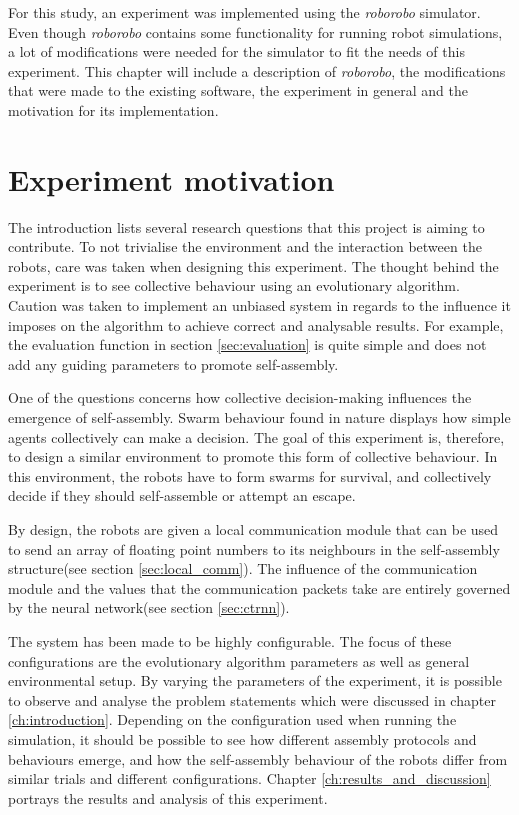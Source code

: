 For this study, an experiment was implemented using the \emph{roborobo} simulator\cite{bredeche_roborobo!_2013}.
Even though \emph{roborobo} contains some functionality for running robot simulations, a lot of modifications were needed for the simulator to fit the needs of this experiment.
This chapter will include a description of \emph{roborobo}, the modifications that were made to the existing software, the experiment in general and the motivation for its implementation.

\section{Experiment motivation}
The introduction lists several research questions that this project is aiming to contribute.
To not trivialise the environment and the interaction between the robots, care was taken when designing this experiment.
The thought behind the experiment is to see collective behaviour using an evolutionary algorithm.
Caution was taken to implement an unbiased system in regards to the influence it imposes on the algorithm to achieve correct and analysable results.  
For example, the evaluation function in section \ref{sec:evaluation} is quite simple and does not add any guiding parameters to promote self-assembly.

One of the questions concerns how collective decision-making influences the emergence of self-assembly.
Swarm behaviour found in nature displays how simple agents collectively can make a decision.
The goal of this experiment is, therefore, to design a similar environment to promote this form of collective behaviour.
In this environment, the robots have to form swarms for survival, and collectively decide if they should self-assemble or attempt an escape.

By design, the robots are given a local communication module that can be used to send an array of floating point numbers to its neighbours in the self-assembly structure(see section \ref{sec:local_comm}).
The influence of the communication module and the values that the communication packets take are entirely governed by the neural network(see section \ref{sec:ctrnn}).

The system has been made to be highly configurable.
The focus of these configurations are the evolutionary algorithm parameters as well as general environmental setup. 
By varying the parameters of the experiment, it is possible to observe and analyse the problem statements which were discussed in chapter \ref{ch:introduction}.
Depending on the configuration used when running the simulation, it should be possible to see how different assembly protocols and behaviours emerge, and how the self-assembly behaviour of the robots differ from similar trials and different configurations.
Chapter \ref{ch:results_and_discussion} portrays the results and analysis of this experiment.


